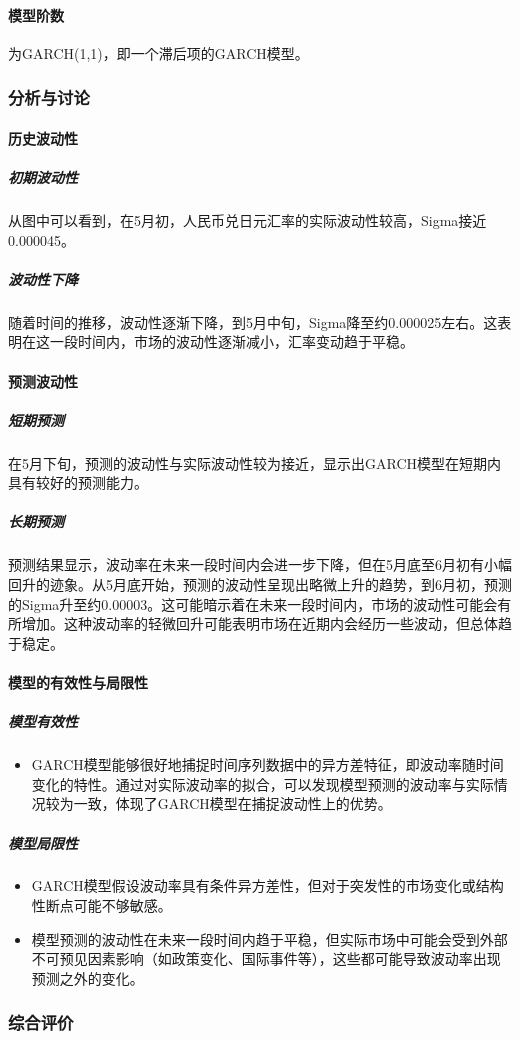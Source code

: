 \paragraph{模型阶数}为GARCH(1,1)，即一个滞后项的GARCH模型。

\subsubsection{分析与讨论}
\paragraph{历史波动性}
\subparagraph{初期波动性}从图中可以看到，在5月初，人民币兑日元汇率的实际波动性较高，Sigma接近0.000045。
\subparagraph{波动性下降}随着时间的推移，波动性逐渐下降，到5月中旬，Sigma降至约0.000025左右。这表明在这一段时间内，市场的波动性逐渐减小，汇率变动趋于平稳。
\paragraph{预测波动性}
\subparagraph{短期预测}在5月下旬，预测的波动性与实际波动性较为接近，显示出GARCH模型在短期内具有较好的预测能力。
\subparagraph{长期预测}预测结果显示，波动率在未来一段时间内会进一步下降，但在5月底至6月初有小幅回升的迹象。从5月底开始，预测的波动性呈现出略微上升的趋势，到6月初，预测的Sigma升至约0.00003。这可能暗示着在未来一段时间内，市场的波动性可能会有所增加。这种波动率的轻微回升可能表明市场在近期内会经历一些波动，但总体趋于稳定。
\paragraph{模型的有效性与局限性}
\subparagraph{模型有效性}
\begin{itemize}
  \item GARCH模型能够很好地捕捉时间序列数据中的异方差特征，即波动率随时间变化的特性。通过对实际波动率的拟合，可以发现模型预测的波动率与实际情况较为一致，体现了GARCH模型在捕捉波动性上的优势。
\end{itemize}
\subparagraph{模型局限性}
\begin{itemize}
  \item GARCH模型假设波动率具有条件异方差性，但对于突发性的市场变化或结构性断点可能不够敏感。
  \item 模型预测的波动性在未来一段时间内趋于平稳，但实际市场中可能会受到外部不可预见因素影响（如政策变化、国际事件等），这些都可能导致波动率出现预测之外的变化。
\end{itemize}

\subsubsection{综合评价}
